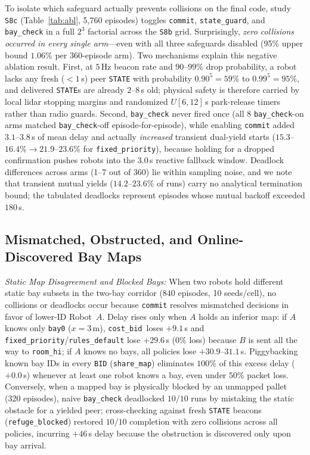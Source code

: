 \documentclass[letterpaper,journal]{IEEEtran}
\newcommand{\cb}{\texttt{cost\_bid}}
\begin{document}
To isolate which safeguard actually prevents collisions on the final code, study \texttt{S8c} (Table~\ref{tab:abl}, 5,760 episodes) toggles \texttt{commit}, \texttt{state\_guard}, and \texttt{bay\_check} in a full $2^3$ factorial across the \texttt{S8b} grid. Surprisingly, \emph{zero collisions occurred in every single arm}---even with all three safeguards disabled (95\% upper bound $1.06\%$ per 360-episode arm). Two mechanisms explain this negative ablation result. First, at $5$\,Hz beacon rate and $90$--$99\%$ drop probability, a robot lacks any fresh ($<1$\,s) peer \texttt{STATE} with probability $0.90^5=59\%$ to $0.99^5=95\%$, and delivered \texttt{STATE}s are already $2$--$8$\,s old; physical safety is therefore carried by local lidar stopping margins and randomized $U[6,12]$\,s park-release timers rather than radio guards. Second, \texttt{bay\_check} never fired once (all 8 \texttt{bay\_check}-on arms matched \texttt{bay\_check}-off episode-for-episode), while enabling \texttt{commit} added $3.1$--$3.8$\,s of mean delay and actually \emph{increased} transient dual-yield starts ($15.3$--$16.4\% \to 21.9$--$23.6\%$ for \texttt{fixed\_priority}), because holding for a dropped confirmation pushes robots into the $3.0$\,s reactive fallback window. Deadlock differences across arms (1--7 out of 360) lie within sampling noise, and we note that transient mutual yields ($14.2$--$23.6\%$ of runs) carry no analytical termination bound; the tabulated deadlocks represent episodes whose mutual backoff exceeded $180$\,s.

\subsection{Mismatched, Obstructed, and Online-Discovered Bay Maps}
\smallskip\noindent\emph{Static Map Disagreement and Blocked Bays:} When two robots hold different static bay subsets in the two-bay corridor (840 episodes, 10 seeds/cell), no collisions or deadlocks occur because \texttt{commit} resolves mismatched decisions in favor of lower-ID Robot~$A$. Delay rises only when $A$ holds an inferior map: if $A$ knows only \texttt{bay0} ($x=3$\,m), \cb\ loses $+9.1$\,s and \texttt{fixed\_priority}/\texttt{rules\_default} lose $+29.6$\,s ($0\%$ loss) because $B$ is sent all the way to \texttt{room\_hi}; if $A$ knows no bays, all policies lose $+30.9$--$31.1$\,s. Piggybacking known bay IDs in every \texttt{BID} (\texttt{share\_map}) eliminates $100\%$ of this excess delay ($+0.0$\,s) whenever at least one robot knows a bay, even under $50\%$ packet loss. Conversely, when a mapped bay is physically blocked by an unmapped pallet (320 episodes), naive \texttt{bay\_check} deadlocked $10/10$ runs by mistaking the static obstacle for a yielded peer; cross-checking against fresh \texttt{STATE} beacons (\texttt{refuge\_blocked}) restored $10/10$ completion with zero collisions across all policies, incurring $+46$\,s delay because the obstruction is discovered only upon bay arrival.
\end{document}
